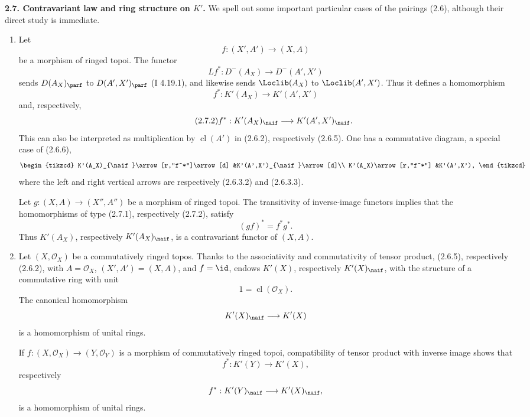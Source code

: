 \documentclass[11pt]{article}
\newcommand{\cl}{\operatorname{cl}}
\begin{document}
\textbf{2.7. Contravariant law and ring structure on \(K'\).} We spell out some important particular cases of the pairings (2.6), although their direct study is immediate.
\begin{enumerate}[label=\alph*)]
\item Let
\[
 f:(X',A')\longrightarrow (X,A)
\]
be a morphism of ringed topoi. The functor
\[
 Lf^*:D^-(A_X)\longrightarrow D^-(A',X')
\]
sends \(D(A_X)_{\parf}\) to \(D(A',X')_{\parf}\) (I 4.19.1), and likewise sends \(\Loclib(A_X)\) to \(\Loclib(A',X')\). Thus it defines a homomorphism
\begin{equation}\tag{2.7.1}
 f^*:K'(A_X)\longrightarrow K'(A',X')
\end{equation}
and, respectively,
\begin{equation}\tag{2.7.2}
 f^*:K'(A_X)_{\naif}\longrightarrow K'(A',X')_{\naif}.
\end{equation}
This can also be interpreted as multiplication by \(\cl(A')\) in (2.6.2), respectively (2.6.5). One has a commutative diagram, a special case of (2.6.6),
\[
\begin{tikzcd}
K'(A_X)_{\naif}\arrow[r,"f^*"]\arrow[d]
&K'(A',X')_{\naif}\arrow[d]\\
K'(A_X)\arrow[r,"f^*"]
&K'(A',X'),
\end{tikzcd}
\]
where the left and right vertical arrows are respectively (2.6.3.2) and (2.6.3.3).

Let \(g:(X,A)\to(X'',A'')\) be a morphism of ringed topoi. The transitivity of inverse-image functors implies that the homomorphisms of type (2.7.1), respectively (2.7.2), satisfy
\begin{equation}\tag{2.7.3}
 (gf)^*=f^*g^*.
\end{equation}
Thus \(K'(A_X)\), respectively \(K'(A_X)_{\naif}\), is a contravariant functor of \((X,A)\).

\item Let \((X,\mathcal O_X)\) be a commutatively ringed topos. Thanks to the associativity and commutativity of tensor product, (2.6.5), respectively (2.6.2), with \(A=\mathcal O_X\), \((X',A')=(X,A)\), and \(f=\id\), endows \(K'(X)\), respectively \(K'(X)_{\naif}\), with the structure of a commutative ring with unit
\[
 1=\cl(\mathcal O_X).
\]
The canonical homomorphism
\[
 K'(X)_{\naif}\longrightarrow K'(X)
\]
is a homomorphism of unital rings.

If \(f:(X,\mathcal O_X)\to(Y,\mathcal O_Y)\) is a morphism of commutatively ringed topoi, compatibility of tensor product with inverse image shows that
\[
 f^*:K'(Y)\longrightarrow K'(X),
\]
respectively
\[
 f^*:K'(Y)_{\naif}\longrightarrow K'(X)_{\naif},
\]
is a homomorphism of unital rings.
\end{enumerate}
\end{document}
